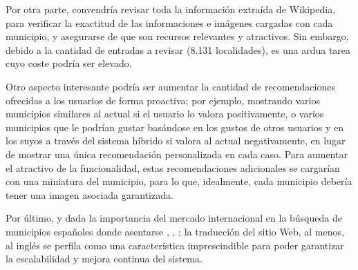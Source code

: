 Por otra parte, convendría revisar toda la información extraída de Wikipedia, para verificar la exactitud de las informaciones e imágenes cargadas con cada municipio, y asegurarse de que son recursos relevantes y atractivos. Sin embargo, debido a la cantidad de entradas a revisar (8.131 localidades), es una ardua tarea cuyo coste podría ser elevado.

Otro aspecto interesante podría ser aumentar la cantidad de recomendaciones ofrecidas a los usuarios de forma proactiva; por ejemplo, mostrando varios municipios similares al actual si el usuario lo valora positivamente, o varios municipios que le podrían gustar basándose en los gustos de otros usuarios y en los suyos a través del sistema híbrido si valora al actual negativamente, en lugar de mostrar una única recomendación personalizada en cada caso. Para aumentar el atractivo de la funcionalidad, estas recomendaciones adicionales se cargarían con una miniatura del municipio, para lo que, idealmente, cada municipio debería tener una imagen asociada garantizada.

Por último, y dada la importancia del mercado internacional en la búsqueda de municipios españoles donde asentarse \cite{extranjeros_1}, \cite{extranjeros_2}, \cite{extranjeros_3}; la traducción del sitio Web, al menos, al inglés se perfila como una característica imprescindible para poder garantizar la escalabilidad y mejora continua del sistema.